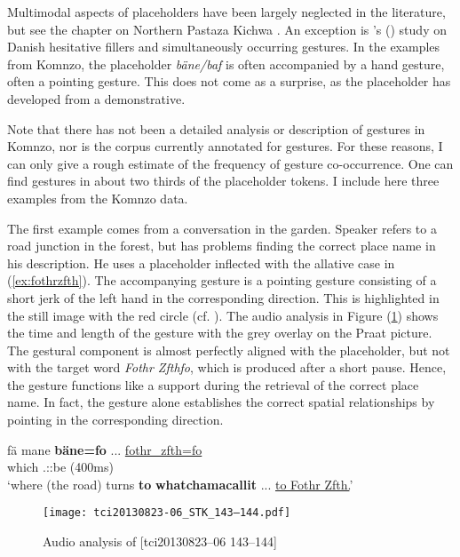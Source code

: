 \documentclass[output=paper,colorlinks,citecolor=brown]{langscibook}
\begin{document}
Multimodal aspects of placeholders have been largely neglected in the literature, but see the chapter on Northern Pastaza Kichwa \citep{chapters/rice}. An exception is \citeauthor{Navarretta:2016yf}'s (\citeyear{Navarretta:2016yf}) study on Danish hesitative fillers and simultaneously occurring gestures. In the examples from Komnzo, the placeholder \textit{bäne/baf} is often accompanied by a hand gesture, often a pointing gesture. This does not come as a surprise, as the placeholder has developed from a demonstrative.

Note that there has not been a detailed analysis or description of gestures in Komnzo, nor is the corpus currently annotated for gestures. For these reasons, I can only give a rough estimate of the frequency of gesture co-occurrence. One can find gestures in about two thirds of the placeholder tokens. I include here three examples from the Komnzo data.

The first example comes from a conversation in the garden. Speaker  refers to a road junction in the forest, but has problems finding the correct place name in his description. He uses a placeholder inflected with the allative case in (\ref{ex:fothrzfth}). The accompanying gesture is a pointing gesture consisting of a short jerk of the left hand in the corresponding direction. This is highlighted in the still image with the red circle (cf. ). The audio analysis in Figure (\ref{fig:doehler:fothrzfth}) shows the time and length of the gesture with the grey overlay on the Praat picture. The gestural component is almost perfectly aligned with the placeholder, but not with the target word \textit{Fothr Zfthfo}, which is produced after a short pause. Hence, the gesture functions like a support during the retrieval of the correct place name. In fact, the gesture alone establishes the correct spatial relationships by pointing in the corresponding direction.

\ea \label{ex:fothrzfth}
    \gll fä mane  \textbf{bäne=fo} ... \uline{fothr\_zfth=fo}\\
     which .::be  (400ms) \\
    \glt `where (the road) turns \textbf{to} \textbf{whatchamacallit} ... \uline{to Fothr Zfth.}' 
\z

\begin{figure}
    \texttt{[image: tci20130823-06\_STK\_143–144.pdf]}
    \caption{Audio analysis of [tci20130823–06  143--144]}
    \label{fig:doehler:fothrzfth}
\end{figure}
\end{document}
